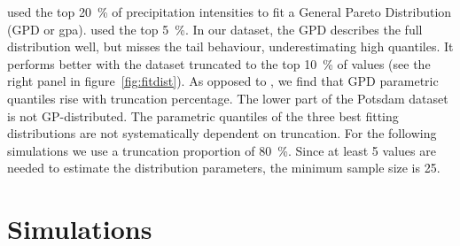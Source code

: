 \documentclass[a4paper]{article}
\begin{document}
\begin{multicols}{2}
\citet{berg_seasonal_2009} used the top 20~\% of precipitation intensities to fit a General Pareto Distribution (GPD or gpa).
\citet{lenderink_increase_2008} used the top 5~\%.
In our dataset, the GPD describes the full distribution well, but misses the tail behaviour, underestimating high quantiles.
It performs better with the dataset truncated to the top 10~\% of values (see the right panel in figure~\ref{fig:fitdist}).
As opposed to \citet{haerter_heavy_2010}, we find that GPD parametric quantiles rise with truncation percentage. 
The lower part of the Potsdam dataset is not GP-distributed.
The parametric quantiles of the three best fitting distributions are not systematically dependent on truncation.
For the following simulations we use a truncation proportion of 80~\%.
Since at least 5 values are needed to estimate the distribution parameters, the minimum sample size is 25.


\end{multicols}


\pagebreak

\section{Simulations} %
\end{document}
